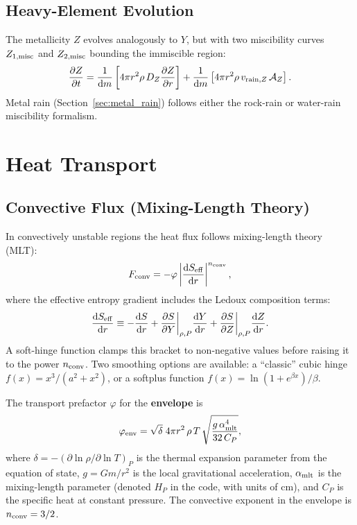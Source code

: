 \documentclass{aastex631}
\newcommand{\dd}{\mathrm{d}}
\newcommand{\pp}{\partial}
\newcommand{\Hp}{H_P}
\newcommand{\Cp}{C_P}
\begin{document}
\subsection{Heavy-Element Evolution}\label{sec:Z_gov}

The metallicity $Z$ evolves analogously to $Y$, but with two miscibility
curves $Z_{1,{\rm misc}}$ and $Z_{2,{\rm misc}}$ bounding the immiscible
region:
\begin{equation}\label{eq:Z_master}
  \frac{\pp Z}{\pp t}
  = \frac{1}{\dd m}\left[
      4\pi r^2\rho\,D_Z\frac{\pp Z}{\pp r}
    \right]
  + \frac{1}{\dd m}\left[
      4\pi r^2\rho\,v_{{\rm rain},Z}\,\mathcal{A}_Z
    \right].
\end{equation}
Metal rain (Section~\ref{sec:metal_rain}) follows either the
\citet{Rogers2025} rock-rain or \citet{Gupta2024} water-rain miscibility
formalism.

\section{Heat Transport}\label{sec:heat}

\subsection{Convective Flux (Mixing-Length Theory)}\label{sec:mlt}

In convectively unstable regions the heat flux follows
mixing-length theory (MLT):
\begin{equation}\label{eq:Fconv}
  F_{\rm conv}
  = -\varphi\left|\frac{\dd S_{\rm eff}}{\dd r}\right|^{n_{\rm conv}},
\end{equation}
where the effective entropy gradient includes the Ledoux composition
terms:
\begin{equation}\label{eq:bracket}
  \frac{\dd S_{\rm eff}}{\dd r}
  \equiv -\frac{\dd S}{\dd r}
  + \frac{\pp S}{\pp Y}\bigg|_{\rho,P}\frac{\dd Y}{\dd r}
  + \frac{\pp S}{\pp Z}\bigg|_{\rho,P}\frac{\dd Z}{\dd r}.
\end{equation}
A soft-hinge function clamps this bracket to non-negative values before
raising it to the power $n_{\rm conv}$.  Two smoothing options are
available: a ``classic'' cubic hinge $f(x) = x^3/(a^2+x^2)$, or a
softplus function $f(x)=\ln(1+e^{\beta x})/\beta$.

The transport prefactor $\varphi$ for the \textbf{envelope} is
\begin{equation}\label{eq:phi_env}
  \varphi_{\rm env}
  = \sqrt{\delta}\;4\pi r^2\,\rho\,T\,
    \sqrt{\frac{g\,\alpha_{\rm mlt}^4}{32\,\Cp}},
\end{equation}
where $\delta=-(\pp\ln\rho/\pp\ln T)_P$ is the thermal expansion
parameter from the equation of state, $g=Gm/r^2$ is the local
gravitational acceleration, $\alpha_{\rm mlt}$ is the mixing-length
parameter (denoted $\Hp$ in the code, with units of cm), and $\Cp$ is the
specific heat at constant pressure.  The convective exponent in the
envelope is $n_{\rm conv}=3/2$.
\end{document}
